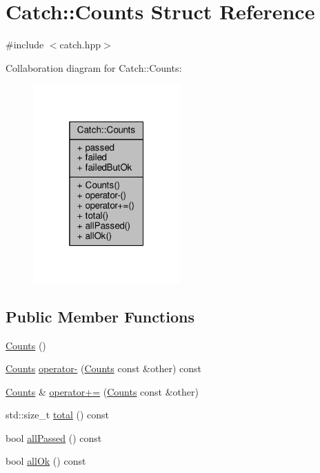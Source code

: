 \hypertarget{struct_catch_1_1_counts}{\section{Catch\-:\-:Counts Struct Reference}
\label{struct_catch_1_1_counts}
}


{\ttfamily \#include $<$catch.\-hpp$>$}



Collaboration diagram for Catch\-:\-:Counts\-:
\nopagebreak
\begin{figure}[H]
\begin{center}
\leavevmode
\includegraphics[width=160pt]{struct_catch_1_1_counts__coll__graph}
\end{center}
\end{figure}
\subsection*{Public Member Functions}
\begin{DoxyCompactItemize}
\item 
\hyperlink{struct_catch_1_1_counts_aab9092ce70d4b0179cc743555d2fc39b}{Counts} ()
\item 
\hyperlink{struct_catch_1_1_counts}{Counts} \hyperlink{struct_catch_1_1_counts_aedf86fefe33938d132a6981171cd83e6}{operator-\/} (\hyperlink{struct_catch_1_1_counts}{Counts} const \&other) const 
\item 
\hyperlink{struct_catch_1_1_counts}{Counts} \& \hyperlink{struct_catch_1_1_counts_a322a89475cd2cc039140ef371e973677}{operator+=} (\hyperlink{struct_catch_1_1_counts}{Counts} const \&other)
\item 
std\-::size\-\_\-t \hyperlink{struct_catch_1_1_counts_a9125c662e30114e5c5cc94729b1e9e84}{total} () const 
\item 
bool \hyperlink{struct_catch_1_1_counts_adbbaca552f6017ce69e0d5dc5500bea4}{all\-Passed} () const 
\item 
bool \hyperlink{struct_catch_1_1_counts_ab2497c9dfc77be757a90225ea69595f5}{all\-Ok} () const 
\end{DoxyCompactItemize}
